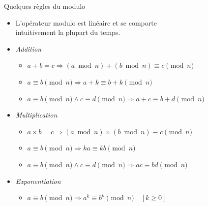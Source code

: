 \documentclass{main}
\begin{document}
\begin{frame}{Quelques règles du modulo}
    \begin{itemize}
        \item L’opérateur modulo est linéaire et se comporte\\intuitivement la plupart du temps.
        \vspace{1em}
        \item \emph{Addition}
        \begin{itemize}
            \item \(
                a + b = c
                \Rightarrow (a \bmod n) + (b \bmod n) \equiv c \pmod{n}
            \)
            \item \(
                a \equiv b \pmod{n}
                \Rightarrow a + k \equiv b + k \pmod{n}
            \)
            \item \(
                a \equiv b \pmod{n} \land c \equiv d \pmod{n}
                \Rightarrow a + c \equiv b + d \pmod{n}
            \)
        \end{itemize}
        \item \emph{Multiplication}
        \begin{itemize}
            \item \(
                a \times b = c
                \Rightarrow (a \bmod n) \times (b \bmod n) \equiv c \pmod{n}
            \)
            \item \(
                a \equiv b \pmod{n}
                \Rightarrow ka \equiv kb \pmod{n}
            \)
            \item \(
                a \equiv b \pmod{n} \land c \equiv d \pmod{n}
                \Rightarrow ac \equiv bd \pmod{n}
            \)
        \end{itemize}
        \item \emph{Exponentiation}
        \begin{itemize}
            \item \(
                a \equiv b \pmod{n}
                \Rightarrow a^k \equiv b^k \pmod{n}
                \quad [k \geq 0]
            \)
        \end{itemize}
    \end{itemize}
\end{frame}
\end{document}
